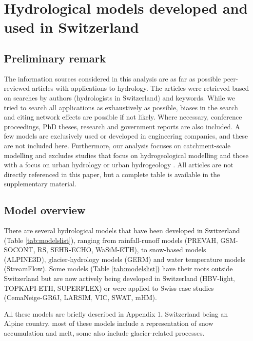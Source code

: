 \documentclass[10pt,a4paper]{article}
\begin{document}
\section{Hydrological models developed and used in Switzerland}
\label{sec:models}

\subsection{Preliminary remark}
\label{sec:models:remark}

The information sources considered in this analysis are as far as
possible peer-reviewed articles with applications to hydrology. The
articles were retrieved based on searches by authors (hydrologists in
Switzerland) and keywords. While we tried to search all applications as
exhaustively as possible, biases in the search and citing network
effects are possible if not likely. Where necessary, conference
proceedings, PhD theses, research and government reports are also
included. A few models are exclusively used or developed in engineering
companies, and these are not included here. Furthermore, our analysis
focuses on catchment-scale modelling and excludes studies that focus on
hydrogeological modelling \citep{Carlier2019} and those with a focus on
urban hydrology \citep{Peleg2017} or urban
hydrogeology \citep{schirmer2013}. All articles are not directly
referenced in this paper, but a complete table is available in the
supplementary material.

\subsection{Model overview}
\label{sec:models:overview}

There are several hydrological models that have been developed in
Switzerland (Table \ref{tab:modelslist}), ranging from
rainfall-runoff models (PREVAH, GSM-SOCONT, RS, SEHR-ECHO, WaSiM-ETH),
to snow-based models (ALPINE3D), glacier-hydrology models (GERM) and
water temperature models (StreamFlow). Some models
(Table \ref{tab:modelslist}) have their roots outside
Switzerland but are now actively being developed in Switzerland
(HBV-light, TOPKAPI-ETH, SUPERFLEX) or were applied to Swiss case
studies (CemaNeige-GR6J, LARSIM, VIC, SWAT, mHM). 

All these models are briefly described in Appendix 1. Switzerland being
an Alpine country, most of these models include a representation of snow
accumulation and melt, some also include glacier-related processes.
\end{document}
